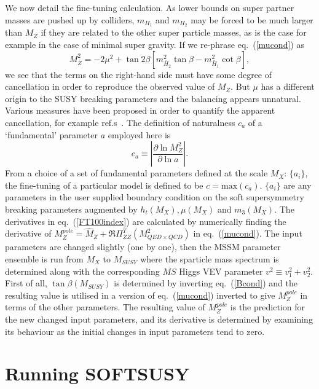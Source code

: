 \documentclass{article}
\begin{document}
We now detail the fine-tuning calculation. 
As lower bounds on super partner masses are pushed up by colliders,
$m_{H_1}$ and $m_{H_2}$ may be forced to be much larger than $M_Z$ if they are
related to the other super particle masses, as is the case
for example in the case of 
minimal super gravity. 
If we re-phrase eq.~(\ref{mucond}) as
\begin{equation}
M_{\bar Z}^2  = -2
\mu^2 + \tan 2\beta \left[m_{\bar{H}_2}^2\tan \beta
- m_{\bar{H}_1}^2  \cot \beta \right],
\end{equation}
we see that the terms on the right-hand side must have 
some degree of cancellation in order to reproduce the 
observed value of $M_Z$.
But $\mu$ has a different origin to the SUSY breaking parameters and the
balancing appears unnatural. Various measures have
been proposed in order to quantify the apparent cancellation, for
example ref.s~\cite{Barbieri:1998uv,deCarlos:1993yy}.
The definition of naturalness $c_a$ 
of a `fundamental' parameter $a$ employed here is~\cite{deCarlos:1993yy} 
\begin{equation}
c_a \equiv \left| \frac{\partial \ln M_Z^2}{\partial \ln a} \right|.
\label{FT100index}
\end{equation}
From a choice of a set of fundamental parameters defined at the scale $M_X$:
$\{ a_i \}$, the 
fine-tuning of a particular model is defined to be $c=\mbox{max}(c_a)$.
$\{ a_i \}$ are any parameters in the user supplied boundary condition on the
soft supersymmetry breaking parameters augmented by $h_t(M_X), \mu(M_X)$ and
$m_3(M_X)$. The derivatives in eq.~(\ref{FT100index}) are calculated by 
numerically finding the derivative of $M_Z^{pole}=\hat M_Z +
\Re\Pi_{ZZ}^T(M_{QED \times QCD}^2)$ in eq.~(\ref{mucond}). 
The input parameters are
changed slightly (one by one), then the MSSM parameter ensemble is run from 
$M_X$ to $M_{SUSY}$ where the sparticle mass spectrum is determined along with the
corresponding $\overline{MS}$ Higgs VEV parameter
$v^2 \equiv v_1^2 + v_2^2$. 
First of all, $\tan \beta(M_{SUSY})$ is determined by inverting
eq.~(\ref{Bcond}) and the resulting value is utilised in a version of
eq.~(\ref{mucond}) inverted to give $M_Z^{pole}$ in terms of the other
parameters.
The resulting value of $M_Z^{pole}$ is the
prediction for the new changed input parameters, and its derivative is
determined by examining its behaviour as the initial changes in input
parameters tend to zero.

\appendix

\section{Running SOFTSUSY}
\label{sec:run}
\end{document}
